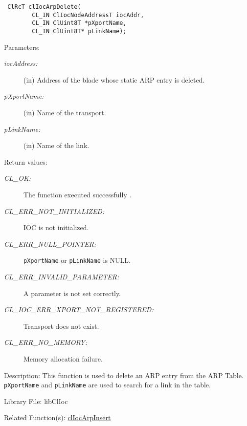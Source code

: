 \begin{flushleft}
\begin{Desc}
\footnotesize\begin{verbatim} ClRcT clIocArpDelete(
        CL_IN ClIocNodeAddressT iocAddr,
        CL_IN ClUint8T *pXportName,
        CL_IN ClUint8T* pLinkName);
\end{verbatim}
\normalsize
\end{Desc}
\begin{Desc}
\item[Parameters:]
\begin{description}
\item[{\em ioc\-Address:}](in) Address of the blade whose static ARP entry is deleted. \item[{\em p\-Xport\-Name:}](in) Name of the transport. 
\item[{\em p\-Link\-Name:}](in) Name of the link.\end{description}
\end{Desc}
\begin{Desc}
\item[Return values:]
\begin{description}
\item[{\em CL\_\-OK:}]The function executed successfully . \item[{\em CL\_\-ERR\_\-NOT\_\-INITIALIZED:}] IOC is not initialized. 
\item[{\em CL\_\-ERR\_\-NULL\_\-POINTER:}]{\tt{pXportName}} or {\tt{pLinkName}} is NULL.
\item[{\em CL\_\-ERR\_\-INVALID\_\-PARAMETER:}]A parameter is not set correctly. 
\item[{\em CL\_\-IOC\_\-ERR\_\-XPORT\_\-NOT\_\-REGISTERED:}]Transport does not exist. 
\item[{\em CL\_\-ERR\_\-NO\_\-MEMORY:}]Memory allocation failure.\end{description}
\end{Desc}
\begin{Desc}
\item[Description:]This function is used to delete an ARP entry from the ARP Table. {\tt{p\-Xport\-Name}} and {\tt{p\-Link\-Name}} are used to search for
a link in the table.\end{Desc}
\begin{Desc}
\item[Library File:]libClIoc\end{Desc}
\begin{Desc}
\item[Related Function(s):]\hyperlink{pageioc208}{cl\-Ioc\-Arp\-Insert} \end{Desc}
\newpage




\end{flushleft}
